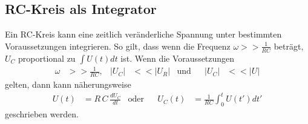 \subsection{RC-Kreis als Integrator} %
\label{sub:Integrator4}
Ein RC-Kreis kann eine zeitlich veränderliche Spannung unter bestimmten Voraussetzungen integrieren.
So gilt, dass wenn die Frequenz $\omega >> \frac{1}{RC}$ beträgt, $U_C$ proportional zu $\int U(t)dt$ ist.
Wenn die Voraussetzungen
\begin{align*}
    \omega&>>\frac{1}{RC},&\lvert U_C\rvert&<< \lvert U_R\rvert &\text{und}&& \lvert U_C\rvert &<< \lvert U\rvert
\end{align*}
gelten, dann kann näherungsweise
\begin{align}
    U(t) &= R\,C \,\frac{dU_C}{dt} &\text{oder} && U_C(t)&= \frac{1}{RC} \int^t_0 U(t') dt'
\end{align}
geschrieben werden.

